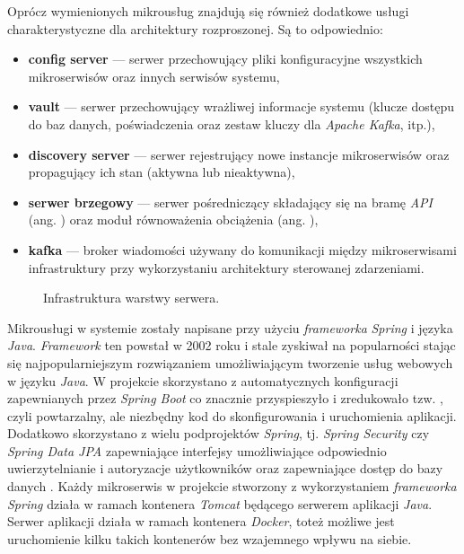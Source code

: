 Oprócz wymienionych mikrousług znajdują się również dodatkowe usługi charakterystyczne dla architektury rozproszonej. Są
to odpowiednio:
%
\begin{itemize}
  \item \textbf{config server} — serwer przechowujący pliki konfiguracyjne wszystkich mikroserwisów oraz innych serwisów
        systemu,
  \item \textbf{vault} — serwer przechowujący wrażliwej informacje systemu (klucze dostępu do baz danych, poświadczenia
        oraz zestaw kluczy dla \textit{Apache Kafka}, itp.),
  \item \textbf{discovery server} — serwer rejestrujący nowe instancje mikroserwisów oraz propagujący ich stan (aktywna
        lub nieaktywna),
  \item \textbf{serwer brzegowy} — serwer pośredniczący składający się na bramę \textit{API} (ang. ) oraz moduł równoważenia obciążenia (ang. ),
  \item \textbf{kafka} — broker wiadomości używany do komunikacji między mikroserwisami infrastruktury przy
        wykorzystaniu architektury sterowanej zdarzeniami.
\end{itemize}
%
\begin{figure}[H]
  \centering
  \caption{Infrastruktura warstwy serwera.}
  \label{fig:server-infra}
\end{figure}


Mikrousługi w systemie zostały napisane przy użyciu \textit{frameworka} \textit{Spring} i języka \textit{Java}.
\textit{Framework} ten powstał w 2002 roku i stale zyskiwał na popularności stając się najpopularniejszym rozwiązaniem
umożliwiającym tworzenie usług webowych w języku \textit{Java}. W projekcie skorzystano z automatycznych konfiguracji
zapewnianych przez \textit{Spring Boot} co znacznie przyspieszyło i zredukowało tzw. , czyli
powtarzalny, ale niezbędny kod do skonfigurowania i uruchomienia aplikacji. Dodatkowo skorzystano z wielu podprojektów
\textit{Spring}, tj. \textit{Spring Security} czy \textit{Spring Data JPA} zapewniające interfejsy umożliwiające
odpowiednio uwierzytelnianie i autoryzacje użytkowników oraz zapewniające dostęp do bazy danych
\cite{bib:spring-walls-2019}. Każdy mikroserwis w projekcie stworzony z wykorzystaniem \textit{frameworka}
\textit{Spring} działa w ramach kontenera \textit{Tomcat} będącego serwerem aplikacji \textit{Java}. Serwer aplikacji
działa w ramach kontenera \textit{Docker}, toteż możliwe jest uruchomienie kilku takich kontenerów bez wzajemnego wpływu
na siebie.


